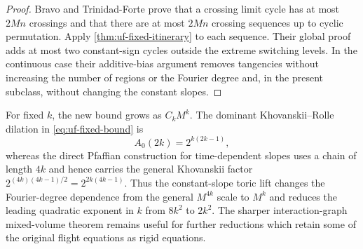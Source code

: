 \begin{proof}
Bravo and Trinidad-Forte prove that a crossing limit cycle has at most $2Mn$
crossings and that there are at most $2Mn$ crossing sequences up to cyclic
permutation.  Apply \cref{thm:uf-fixed-itinerary} to each sequence.  Their
global proof adds at most two constant-sign cycles outside the extreme
switching levels.  In the continuous case their additive-bias argument removes
tangencies without increasing the number of regions or the Fourier degree and,
in the present subclass, without changing the constant slopes.
\end{proof}

\begin{remark}
For fixed $k$, the new bound grows as $C_kM^k$.  The dominant
Khovanskii--Rolle dilation in \eqref{eq:uf-fixed-bound} is
\[
 A_0(2k)=2^{k(2k-1)},
\]
whereas the direct Pfaffian construction for time-dependent slopes uses a chain
of length $4k$ and hence carries the general Khovanskii factor
$2^{(4k)(4k-1)/2}=2^{2k(4k-1)}$.  Thus the constant-slope toric lift changes the
Fourier-degree dependence from the general $M^{4k}$ scale to $M^k$ and reduces
the leading quadratic exponent in $k$ from $8k^2$ to $2k^2$.  The sharper
interaction-graph mixed-volume theorem remains useful for further reductions
which retain some of the original flight equations as rigid equations.
\end{remark}
